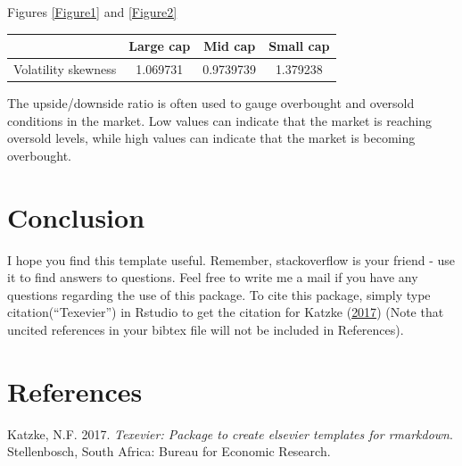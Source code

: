 \documentclass[11pt,preprint, authoryear]{elsarticle}
\let\origtable\table
\let\endorigtable\endtable
\renewenvironment{table}[1][2] {
    \expandafter\origtable\expandafter[H]
} {
    \endorigtable
}
\numberwithin{equation}{section}
\numberwithin{figure}{section}
\numberwithin{table}{section}
\newlength{\cslhangindent}
\newenvironment{CSLReferences}%
  {\setlength{\parindent}{0pt}%
  \everypar{\setlength{\hangindent}{\cslhangindent}}\ignorespaces}%
  {\par}
\begin{document}
Figures \ref{Figure1} and \ref{Figure2}

\begin{table}[h]
\begin{center}
    \begin{tabular}{| c | c | c | c |}
    \hline
         & Large cap & Mid cap & Small cap \\
        \hline
        Volatility skewness & 1.069731 & 0.9739739 & 1.379238 \\
        \hline
    \end{tabular}
    \caption{Volatility skewness}
    \label{tab:VS}
\end{center}
\end{table}

The upside/downside ratio is often used to gauge overbought and oversold
conditions in the market. Low values can indicate that the market is
reaching oversold levels, while high values can indicate that the market
is becoming overbought.

\hfill

\hypertarget{conclusion}{%
\section{\texorpdfstring{Conclusion
\label{Conclusion}}{Conclusion }}\label{conclusion}}

I hope you find this template useful. Remember, stackoverflow is your
friend - use it to find answers to questions. Feel free to write me a
mail if you have any questions regarding the use of this package. To
cite this package, simply type citation(``Texevier'') in Rstudio to get
the citation for Katzke (\protect\hyperlink{ref-Texevier}{2017}) (Note
that uncited references in your bibtex file will not be included in
References).

\newpage

\hypertarget{references}{%
\section*{References}\label{references}}

\hypertarget{refs}{}
\begin{CSLReferences}{1}{0}
\leavevmode{}%
Katzke, N.F. 2017. \emph{{Texevier}: {P}ackage to create elsevier
templates for rmarkdown}. Stellenbosch, South Africa: Bureau for
Economic Research.

\end{CSLReferences}
\end{document}
